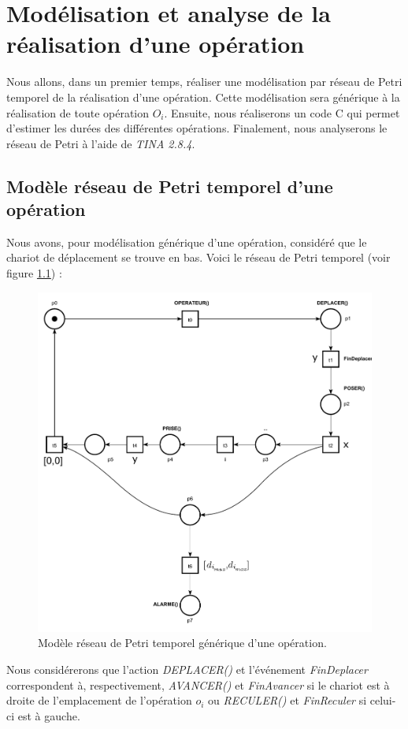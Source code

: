 \chapter{Modélisation et analyse de la réalisation d'une opération}\label{chap:realisationUneOperation}
Nous allons, dans un premier temps, réaliser une modélisation par réseau de Petri temporel de la réalisation d'une opération. Cette modélisation sera générique à la réalisation de toute opération $O_i$. Ensuite, nous réaliserons un code C qui permet d'estimer les durées des différentes opérations. Finalement, nous analyserons le réseau de Petri à l'aide de \emph{TINA 2.8.4}.

\section{Modèle réseau de Petri temporel d'une opération}\label{sec:modelGenerique}
Nous avons, pour modélisation générique d'une opération, considéré que le chariot de déplacement se trouve en bas. Voici le réseau de Petri temporel (voir figure \ref{fig:RdPTempo_generique}) : \\
\begin{figure}[!ht]
\centering
\includegraphics[width=.57\textwidth]{./I/images/III-1_v3.pdf}
\caption{\label{fig:RdPTempo_generique}Modèle réseau de Petri temporel générique d'une opération.}
\end{figure}


Nous considérerons que l'action \emph{DEPLACER()} et l'événement \emph{FinDeplacer} correspondent à, respectivement, \emph{AVANCER()} et \emph{FinAvancer} si le chariot est à droite de l'emplacement de l'opération $o_i$  ou \emph{RECULER()} et \emph{FinReculer} si celui-ci est à gauche.



